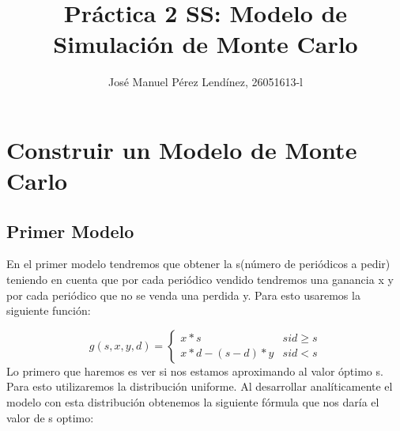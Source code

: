 \documentclass[]{article}
\title{Práctica 2 SS: Modelo de Simulación de Monte Carlo}
\author{José Manuel Pérez Lendínez, 26051613-l}
\begin{document}
	
	\maketitle
	
	
	\newpage
	\tableofcontents
	\newpage
	
\section{Construir un Modelo de Monte Carlo}
\subsection{Primer Modelo}

En el primer modelo tendremos que obtener la s(número de periódicos a pedir) teniendo en cuenta que por cada periódico vendido tendremos una ganancia x y por cada periódico que no se venda una perdida y.  Para esto usaremos la siguiente función:


$$g(s, x, y, d)=\left\{\begin{array}{ll}{x * s} & { { si } d \geq s} \\ {x * d-(s-d) * y} & { { si } d<s}\end{array}\right.$$
\newline
Lo primero que haremos es ver si nos estamos aproximando al valor óptimo s. Para esto utilizaremos la distribución uniforme. Al desarrollar analíticamente el modelo con esta distribución obtenemos la siguiente fórmula que nos daría el valor de s optimo:
\end{document}
